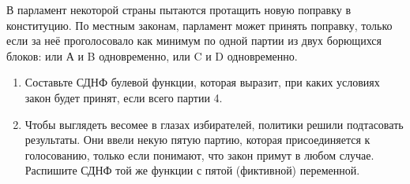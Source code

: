 \question
В парламент некоторой страны пытаются протащить новую поправку в конституцию. По местным законам, парламент может принять поправку, только если за неё проголосовало как минимум по одной партии из двух борющихся блоков: или А и B одновременно, или C и D одновременно.

\begin{enumerate}
    \item Составьте СДНФ булевой функции, которая выразит, при каких условиях закон будет принят, если всего партии 4.
    \item Чтобы выглядеть весомее в глазах избирателей, политики решили подтасовать результаты.  Они ввели некую пятую партию, которая присоединяется к голосованию, только если понимают, что закон примут в любом случае. Распишите СДНФ той же функции с пятой (фиктивной) переменной.
\end{enumerate}